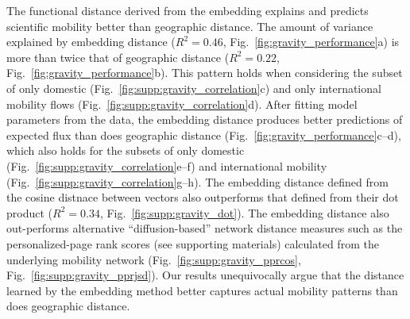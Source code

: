 \documentclass[12pt]{article} %
\begin{document}
The functional distance derived from the embedding explains and predicts scientific mobility better than geographic distance.
The amount of variance explained by embedding distance ($R^{2} = 0.46$, Fig.~\ref{fig:gravity_performance}a) is more than twice that of geographic distance ($R^{2} = 0.22$, Fig.~\ref{fig:gravity_performance}b).
This pattern holds when considering the subset of only domestic (Fig.~\ref{fig:supp:gravity_correlation}c) and only international mobility flows (Fig.~\ref{fig:supp:gravity_correlation}d).
After fitting model parameters from the data, the embedding distance produces better predictions of expected flux than does geographic distance (Fig.~\ref{fig:gravity_performance}c--d), which also holds for the subsets of only domestic (Fig.~\ref{fig:supp:gravity_correlation}e--f) and international mobility (Fig.~\ref{fig:supp:gravity_correlation}g--h).
The embedding distance defined from the cosine distnace between vectors also outperforms that defined from their dot product ($R^{2} = 0.34$, Fig.~\ref{fig:supp:gravity_dot}).
The embedding distance also out-performs alternative ``diffusion-based'' network distance measures such as the personalized-page rank scores (see supporting materials) calculated from the underlying mobility network (Fig.~\ref{fig:supp:gravity_pprcos}, Fig.~\ref{fig:supp:gravity_pprjsd}).
Our results unequivocally argue that the distance learned by the embedding method better captures actual mobility patterns than does geographic distance. 
\end{document}

